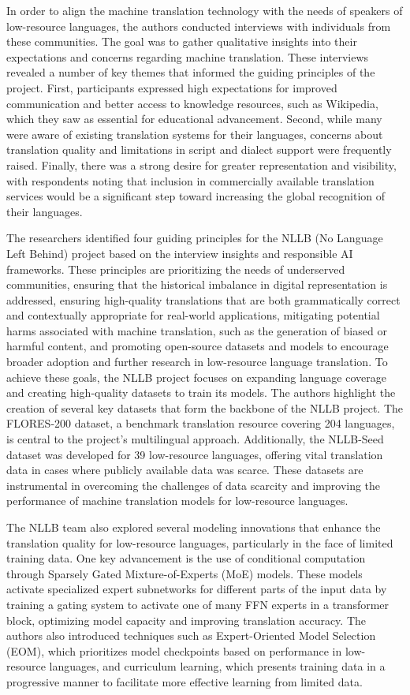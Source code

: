 In order to align the machine translation technology with the needs of speakers of low-resource languages, the authors conducted interviews with individuals from these communities. The goal was to gather qualitative insights into their expectations and concerns regarding machine translation. These interviews revealed a number of key themes that informed the guiding principles of the project. First, participants expressed high expectations for improved communication and better access to knowledge resources, such as Wikipedia, which they saw as essential for educational advancement. Second, while many were aware of existing translation systems for their languages, concerns about translation quality and limitations in script and dialect support were frequently raised. Finally, there was a strong desire for greater representation and visibility, with respondents noting that inclusion in commercially available translation services would be a significant step toward increasing the global recognition of their languages.

The researchers identified four guiding principles for the NLLB (No Language Left Behind) project based on the interview insights and responsible AI frameworks. These principles are prioritizing the needs of underserved communities, ensuring that the historical imbalance in digital representation is addressed, ensuring high-quality translations that are both grammatically correct and contextually appropriate for real-world applications, mitigating potential harms associated with machine translation, such as the generation of biased or harmful content, and promoting open-source datasets and models to encourage broader adoption and further research in low-resource language translation.
To achieve these goals, the NLLB project focuses on expanding language coverage and creating high-quality datasets to train its models. The authors highlight the creation of several key datasets that form the backbone of the NLLB project. The FLORES-200 dataset, a benchmark translation resource covering 204 languages, is central to the project's multilingual approach. Additionally, the NLLB-Seed dataset was developed for 39 low-resource languages, offering vital translation data in cases where publicly available data was scarce. These datasets are instrumental in overcoming the challenges of data scarcity and improving the performance of machine translation models for low-resource languages.

The NLLB team also explored several modeling innovations that enhance the translation quality for low-resource languages, particularly in the face of limited training data. One key advancement is the use of conditional computation through Sparsely Gated Mixture-of-Experts (MoE) models. These models activate specialized expert subnetworks for different parts of the input data by training a gating system to activate one of many FFN experts in a transformer block, optimizing model capacity and improving translation accuracy. The authors also introduced techniques such as Expert-Oriented Model Selection (EOM), which prioritizes model checkpoints based on performance in low-resource languages, and curriculum learning, which presents training data in a progressive manner to facilitate more effective learning from limited data.

